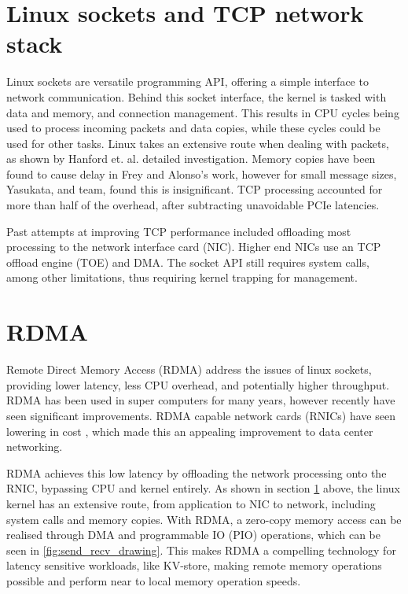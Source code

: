 \section[Linux scoket and TCP]{Linux sockets and TCP network stack}\label{sec:linux-sockets}
Linux sockets are versatile programming API, offering a simple interface to network communication.
Behind this socket interface, the kernel is tasked with data and memory, and connection management\cite{hanford2018survey,seth2009tcp}.
This results in CPU cycles being used to process incoming packets and data copies, while these cycles could be used for other tasks.
Linux takes an extensive route when dealing with packets, as shown by Hanford et. al. detailed investigation\cite{hanford2018survey}.
Memory copies have been found to cause delay in Frey and Alonso's work\cite{frey2009minimizing}, however for small message sizes, Yasukata, and team, found this is insignificant\cite{yasukata2016stackmap}.
TCP processing accounted for more than half of the overhead, after subtracting unavoidable PCIe latencies.

Past attempts at improving TCP performance included offloading most processing to the network interface card (NIC)\cite{hanford2018survey}.
Higher end NICs use an TCP offload engine (TOE) and DMA.
The socket API still requires system calls, among other limitations, thus requiring kernel trapping for management.

\section[RDMA]{RDMA}\label{sec:rdma}
Remote Direct Memory Access (RDMA) address the issues of linux sockets, providing lower latency, less CPU overhead, and potentially higher throughput.
RDMA has been used in super computers for many years, however recently have seen significant improvements.
RDMA capable network cards (RNICs) have seen lowering in cost \cite{kalia2016design}, which made this an appealing improvement to data center networking.

RDMA achieves this low latency by offloading the network processing onto the RNIC, bypassing CPU and kernel entirely.
As shown in section \ref{sec:linux-sockets} above, the linux kernel has an extensive route, from application to NIC to network, including system calls and memory copies.
With RDMA, a zero-copy memory access can be realised through DMA and programmable IO (PIO) operations, which can be seen in \ref{fig:send_recv_drawing}.
This makes RDMA a compelling technology for latency sensitive workloads, like KV-store, making remote memory operations possible and perform near to local memory operation speeds.

